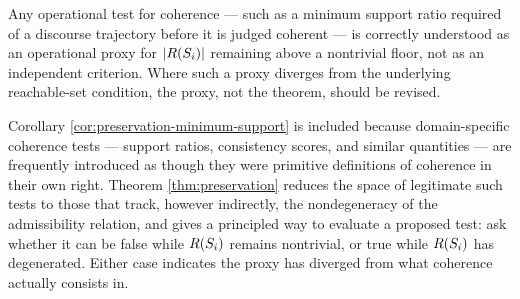 \begin{corollary}
\label{cor:preservation-minimum-support}
Any operational test for coherence --- such as a minimum support ratio
required of a discourse trajectory before it is judged coherent --- is
correctly understood as an operational proxy for $|R(S_i)|$
remaining above a nontrivial floor, not as an independent criterion.
Where such a proxy diverges from the underlying reachable-set condition,
the proxy, not the theorem, should be revised.
\end{corollary}

Corollary \ref{cor:preservation-minimum-support} is included because
domain-specific coherence tests --- support ratios, consistency scores,
and similar quantities --- are frequently introduced as though they were
primitive definitions of coherence in their own right. Theorem
\ref{thm:preservation} reduces the space of legitimate such tests to
those that track, however indirectly, the nondegeneracy of the
admissibility relation, and gives a principled way to evaluate a
proposed test: ask whether it can be false while $R(S_i)$ remains
nontrivial, or true while $R(S_i)$ has degenerated. Either case
indicates the proxy has diverged from what coherence actually
consists in.

